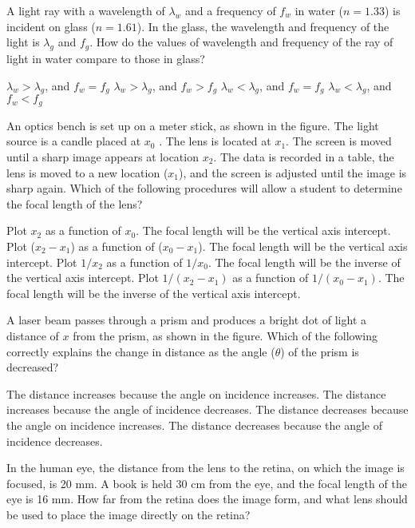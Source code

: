 \documentclass{../../../oss-ap12ibhl}
\begin{document}
\begin{questions}
  \question A light ray with a wavelength of $\lambda_w$ and a frequency of
  $f_w$ in water ($n=1.33$) is incident on glass ($n=1.61$). In the glass,
  the wavelength and frequency of the light is $\lambda_g$ and $f_g$. How do
  the values of wavelength and frequency of the ray of light in water compare
  to those in glass?
  \begin{choices}
    \choice $\lambda_w>\lambda_g$, and $f_w=f_g$
    \choice $\lambda_w>\lambda_g$, and $f_w>f_g$
    \choice $\lambda_w<\lambda_g$, and $f_w=f_g$
    \choice $\lambda_w<\lambda_g$, and $f_w<f_g$
  \end{choices}
%    
  \question An optics bench is set up on a meter stick, as shown in the figure.
  The light source is a candle placed at $x_0$ . The lens is located at $x_1$.
  The screen is moved until a sharp image appears at location $x_2$. The data is
  recorded in a table, the lens is moved to a new location ($x_1$), and the
  screen is adjusted until the image is sharp again. Which of the following
  procedures will allow a student to determine the focal length of the lens?
  \begin{choices}
    \choice Plot $x_2$ as a function of $x_0$. The focal length will be the
    vertical axis intercept.
    \choice Plot ($x_2-x_1$) as a function of ($x_0-x_1$). The focal length will
    be the vertical axis intercept.
    \choice Plot $1/x_2$ as a function of $1/x_0$. The focal length will be the
    inverse of the vertical axis intercept.
    \choice Plot $1/(x_2-x_1)$ as a function of $1/(x_0-x_1)$. The focal length
    will be the inverse of the vertical axis intercept.
  \end{choices}
%    
  \question A laser beam passes through a prism and produces a bright dot of
  light a distance of $x$ from the prism, as shown in the figure. Which of the
  following correctly explains the change in distance as the angle
  ($\theta$) of the prism is decreased?
  \begin{choices}
    \choice The distance increases because the angle on incidence increases.
    \choice The distance increases because the angle of incidence decreases.
    \choice The distance decreases because the angle on incidence increases.
    \choice The distance decreases because the angle of incidence decreases.
  \end{choices}
%    
  \question In the human eye, the distance from the lens to the retina, on
  which the image is focused, is 20 mm. A book is held 30 cm from the eye, and
  the focal length of the eye is 16 mm. How far from the retina does the
  image form, and what lens should be used to place the image directly
  on the retina?
   

\end{questions}
\end{document}
